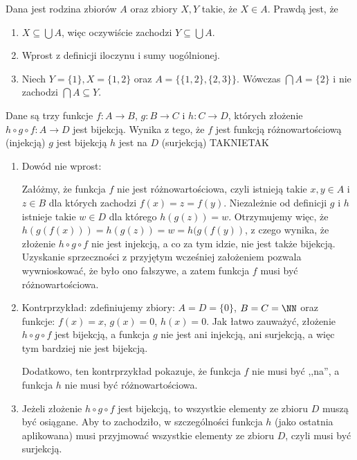 \begin{solutions}
    \sol Dana jest rodzina zbiorów $A$ oraz zbiory $X, Y$ takie, że $X \in A$. Prawdą jest, że

    \begin{enumerate}[\bf A.]
        \item $X \subseteq \bigcup A$, więc oczywiście zachodzi $Y \subseteq \bigcup A$.
        \item Wprost z definicji iloczynu i sumy uogólnionej.
        \item Niech $Y = \{1\}, X = \{1,2\}$ oraz $A = \{\{1,2\},\{2,3\}\}$. Wówczas $\bigcap A = \{2\}$ i nie zachodzi $\bigcap A \subseteq Y$.
    \end{enumerate}

    \sol Dane są trzy funkcje $f: A \rightarrow B$, $g: B \rightarrow C$ i $h: C \rightarrow D$, których złożenie $h \circ g \circ f: A \rightarrow D$ jest bijekcją. Wynika z tego, że
    \answerss
    {$f$ jest funkcją różnowartościową (injekcją)}
    {$g$ jest bijekcją}
    {$h$ jest na $D$ (surjekcją)}
    {TAK}{NIE}{TAK}

    \begin{enumerate}[\bf A.]
        \item Dowód nie wprost:
        
        Załóżmy, że funkcja $f$ nie jest różnowartościowa, czyli istnieją takie $x, y \in A$ i $z \in B$ dla których zachodzi $f(x) = z = f(y)$. Niezależnie od definicji $g$ i $h$ istnieje takie $w \in D$ dla którego $h(g(z)) = w$. Otrzymujemy więc, że $h(g(f(x))) = h(g(z)) = w = h(g(f(y))$, z czego wynika, że złożenie $h \circ g \circ f$ nie jest injekcją, a co za tym idzie, nie jest także bijekcją. Uzyskanie sprzeczności z przyjętym wcześniej założeniem pozwala wywnioskować, że było ono fałszywe, a zatem funkcja $f$ musi być różnowartościowa.
        
        \item Kontrprzykład: zdefiniujemy zbiory: $A = D = \{ 0\}$, $B = C = \NN$ oraz funkcje: $f(x) = x$, $g(x) = 0$, $h(x) = 0$. Jak łatwo zauważyć, złożenie $h \circ g \circ f$ jest bijekcją, a funkcja $g$ nie jest ani injekcją, ani surjekcją, a więc tym bardziej nie jest bijekcją.
        
        Dodatkowo, ten kontrprzykład pokazuje, że funkcja $f$ nie musi być ,,na'', a funkcja $h$ nie musi być różnowartościowa.
        \item Jeżeli złożenie $h \circ g \circ f$ jest bijekcją, to wszystkie elementy ze zbioru $D$ muszą być osiągane. Aby to zachodziło, w szczególności funkcja $h$ (jako ostatnia aplikowana) musi przyjmować wszystkie elementy ze zbioru $D$, czyli musi być surjekcją.
    \end{enumerate}


\end{solutions}
